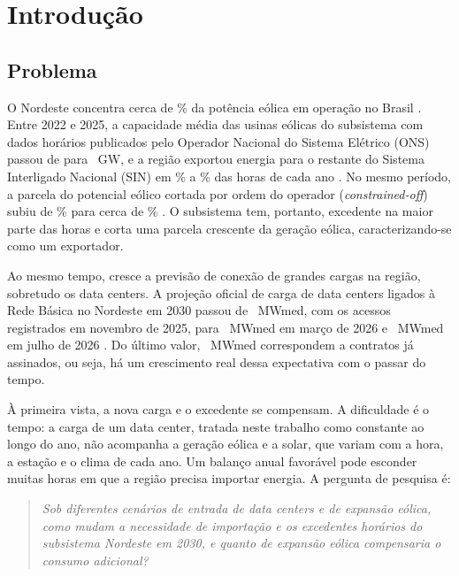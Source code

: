 \section{Introdução}
\label{sec:introducao}

\subsection{Problema}
\label{sec:problema}

O Nordeste concentra cerca de \PctEolicaNE\% da potência eólica em operação no Brasil \parencite{aneel_siga}. Entre 2022 e 2025, a capacidade média das usinas eólicas do subsistema com dados horários publicados pelo Operador Nacional do Sistema Elétrico (ONS) passou de \CapEolIni{} para \CapEolFim~GW, e a região exportou energia para o restante do Sistema Interligado Nacional (SIN) em \ExpMin\% a \ExpMax\% das horas de cada ano \parencite{ons_dados}. No mesmo período, a parcela do potencial eólico cortada por ordem do operador (\textit{constrained-off}) subiu de \CorteIni\% para cerca de \CorteFim\% \parencite{ons_dados}. O subsistema tem, portanto, excedente na maior parte das horas e corta uma parcela crescente da geração eólica, caracterizando-se como um exportador.

Ao mesmo tempo, cresce a previsão de conexão de grandes cargas na região, sobretudo os data centers. A projeção oficial de carga de data centers ligados à Rede Básica no Nordeste em 2030 passou de \DcPlan~MWmed, com os acessos registrados em novembro de 2025, para \DcRqUm~MWmed em março de 2026 e \DcRqDois~MWmed em julho de 2026 \parencite{plan_nt,plan_1rq,plan_2rq}. Do último valor, \DcContratos~MWmed correspondem a contratos já assinados, ou seja, há um crescimento real dessa expectativa com o passar do tempo.

À primeira vista, a nova carga e o excedente se compensam. A dificuldade é o tempo: a carga de um data center, tratada neste trabalho como constante ao longo do ano, não acompanha a geração eólica e a solar, que variam com a hora, a estação e o clima de cada ano. Um balanço anual favorável pode esconder muitas horas em que a região precisa importar energia. A pergunta de pesquisa é:

\begin{quote}
\textit{Sob diferentes cenários de entrada de data centers e de expansão eólica, como mudam a necessidade de importação e os excedentes horários do subsistema Nordeste em 2030, e quanto de expansão eólica compensaria o consumo adicional?}
\end{quote}

